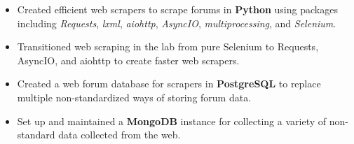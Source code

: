 \documentclass[10pt]{article}
\begin{document}
  \begin{itemize}[nosep]%

    \item Created efficient web scrapers to scrape forums in \textbf{Python} using packages including \textit{Requests}, \textit{lxml}, \textit{aiohttp}, \textit{AsyncIO}, \textit{multiprocessing}, and \textit{Selenium}.
    \item Transitioned web scraping in the lab from pure Selenium to Requests, AsyncIO, and aiohttp to create faster web scrapers.
    \item Created a web forum database for scrapers in \textbf{PostgreSQL} to replace multiple non-standardized ways of storing forum data.
    \item Set up and maintained a \textbf{MongoDB} instance for collecting a variety of non-standard data collected from the web.
          
  \end{itemize}
\end{document}
